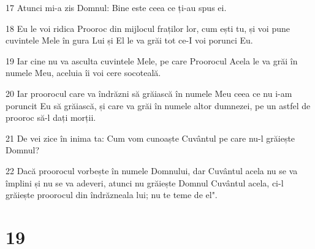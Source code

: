 \par 17 Atunci mi-a zis Domnul: Bine este ceea ce ți-au spus ei.
\par 18 Eu le voi ridica Prooroc din mijlocul fraților lor, cum ești tu, și voi pune cuvintele Mele în gura Lui și El le va grăi tot ce-I voi porunci Eu.
\par 19 Iar cine nu va asculta cuvintele Mele, pe care Proorocul Acela le va grăi în numele Meu, aceluia îi voi cere socoteală.
\par 20 Iar proorocul care va îndrăzni să grăiască în numele Meu ceea ce nu i-am poruncit Eu să grăiască, și care va grăi în numele altor dumnezei, pe un astfel de prooroc să-l dați morții.
\par 21 De vei zice în inima ta: Cum vom cunoaște Cuvântul pe care nu-l grăiește Domnul?
\par 22 Dacă proorocul vorbește în numele Domnului, dar Cuvântul acela nu se va împlini și nu se va adeveri, atunci nu grăiește Domnul Cuvântul acela, ci-l grăiește proorocul din îndrăzneala lui; nu te teme de el".

\chapter{19}

